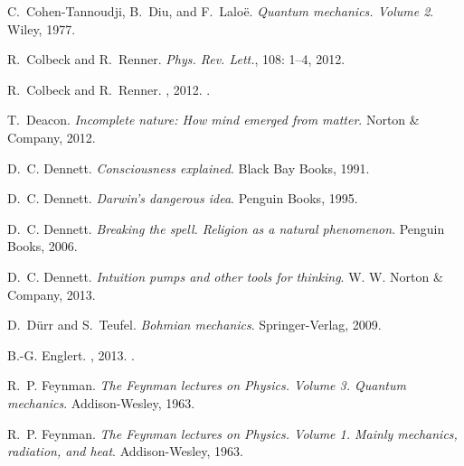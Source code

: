 \documentclass[12pt]{article}
\begin{document}
\begin{thebibliography}{63}
C.~Cohen-Tannoudji, B.~Diu, and F.~Lalo\"{e}.
\newblock \emph{{Quantum mechanics. Volume 2}}.
\newblock Wiley, 1977{}.

R.~Colbeck and R.~Renner.
\newblock \emph{Phys. Rev. Lett.}, 108: 1--4, 2012{}.

R.~Colbeck and R.~Renner.
, 2012{}.
.

T.~Deacon.
\newblock \emph{{Incomplete nature: How mind emerged from matter}}.
\newblock Norton \& Company, 2012.

D.~C. Dennett.
\newblock \emph{{Consciousness explained}}.
\newblock Black Bay Books, 1991.

D.~C. Dennett.
\newblock \emph{{Darwin's dangerous idea}}.
\newblock Penguin Books, 1995.

D.~C. Dennett.
\newblock \emph{{Breaking the spell. Religion as a natural phenomenon}}.
\newblock Penguin Books, 2006.

D.~C. Dennett.
\newblock \emph{{Intuition pumps and other tools for thinking}}.
\newblock W. W. Norton \& Company, 2013.

D.~D\"{u}rr and S.~Teufel.
\newblock \emph{{Bohmian mechanics}}.
\newblock Springer-Verlag, 2009.

B.-G. Englert.
, 2013.
.

R.~P. Feynman.
\newblock \emph{{The Feynman lectures on Physics. Volume 3. Quantum
  mechanics}}.
\newblock Addison-Wesley, 1963{}.

R.~P. Feynman.
\newblock \emph{{The Feynman lectures on Physics. Volume 1. Mainly mechanics,
  radiation, and heat}}.
\newblock Addison-Wesley, 1963{}.


\end{thebibliography}
\end{document}
